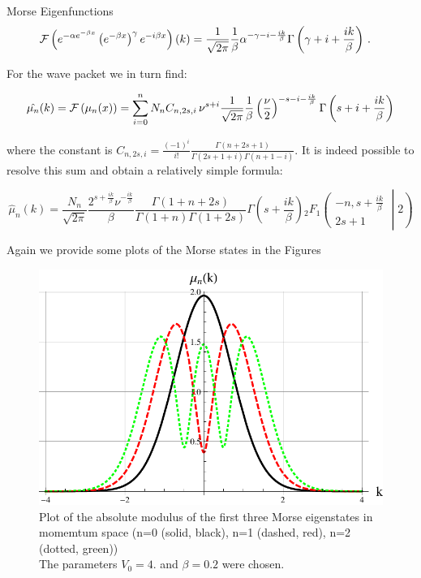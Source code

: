 \begin{chapter}{Morse Eigenfunctions}
\begin{align}
  \mathcal{F}\left(e^{-\alpha e^{-\beta x}} \left(e^{-\beta x}\right)^{\gamma} e^{- i \beta x}\right)(k)
  & = \frac{1}{\sqrt{2\pi}}
  \frac{1}{\beta}
  \alpha^{-\gamma -i -\frac{i k}{\beta}}
  \Gamma \left(\gamma+i+\frac{i k}{\beta}\right) \,.
\end{align}

For the wave packet we in turn find:

\begin{equation}
  \hat{\mu_{n}}(k) = \mathcal{F}\left(\mu_{n}(x)\right) =
  \sum_{i=0}^{n}
  N_{n} C_{n,2s,i} \, \nu^{s+i}
  \frac{1}{\sqrt{2\pi}}
  \frac{1}{\beta}
  \left(\frac{\nu}{2}\right)^{-s -i -\frac{i k}{\beta}}
  \Gamma \left(s+i+\frac{i k}{\beta}\right)
\end{equation}

where the constant is $C_{n,2s,i} = \frac{(-1)^{i}}{i!} \frac{\Gamma(n+2s+1)}{\Gamma(2s+1+i) \Gamma(n+1-i)}$. It is indeed possible to resolve this sum and obtain a relatively simple formula:

\begin{equation*}
  \hat{\mu}_{n}(k) =
  \frac{N_{n}}{\sqrt{2\pi}}
  \frac{2^{s+\frac{i k}{\beta}} \nu^{-\frac{i k}{\beta}}}{\beta}
  \frac{\Gamma(1+n+2s)}{\Gamma(1+n)\Gamma(1+2s)}
  \Gamma\left(s+\frac{i k}{\beta}\right)
  {}_{2}F_{1}
  \left(
    \begin{matrix}
      - n, s + \frac{i k}{\beta} \\
      2s + 1
    \end{matrix}
    \middle| {2} \right)
\end{equation*}

Again we provide some plots of the Morse states in the Figures

\begin{figure}[h!]
	\includegraphics[width=1.0\linewidth]{./figures/MorseFourier/FourierAbsn0_2.pdf}
       \caption[Morse momentum wavefunction for $n=0,1,2$]{
	   Plot of the absolute modulus of the first three Morse eigenstates in momemtum space
	   (n=0 (solid, black), n=1 (dashed, red), n=2 (dotted, green))\\
	   The parameters $V_0=4.$ and $\beta=0.2$ were chosen.
	\label{fig:FourierAbsn0_2}
    }


\end{figure}
\end{chapter}
